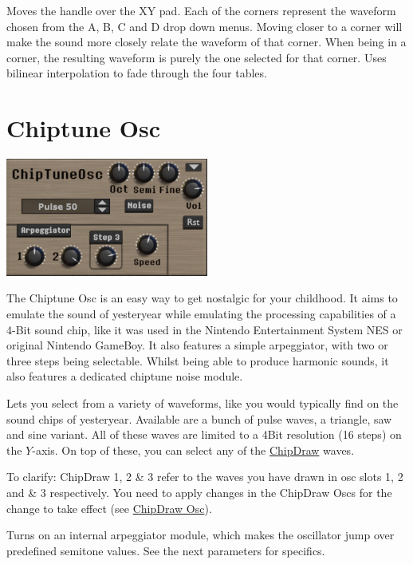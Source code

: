 {Moves the handle over the XY pad. Each of the corners represent the waveform chosen from the A, B, C and D drop down menus. Moving closer to a corner will make the sound more closely relate the waveform of that corner. When being in a corner, the resulting waveform is purely the one selected for that corner. Uses bilinear interpolation to fade through the four tables.}

\section{Chiptune Osc}
\begin{center}
    \includegraphics[width=0.5\textwidth]{graphics/chiptune_osc.png}
\end{center}
The Chiptune Osc is an easy way to get nostalgic for your childhood. It aims to emulate the sound of yesteryear while emulating the processing capabilities of a 4-Bit sound chip, like it was used in the Nintendo Entertainment System NES or original Nintendo GameBoy. It also features a simple arpeggiator, with two or three steps being selectable. Whilst being able to produce harmonic sounds, it also features a dedicated chiptune noise module.

{Lets you select from a variety of waveforms, like you would typically find on the sound chips of yesteryear. Available are a bunch of pulse waves, a triangle, saw and sine variant. All of these waves are limited to a 4Bit resolution (16 steps) on the $Y$-axis. On top of these, you can select any of the \hyperref[chipdraw]{ChipDraw} waves.

To clarify: ChipDraw 1, 2 \& 3 refer to the waves you have drawn in osc slots 1, 2 and \& 3 respectively. You need to apply changes in the ChipDraw Oscs for the change to take effect (see \hyperref[chipdraw]{ChipDraw Osc}).}

{Turns on an internal arpeggiator module, which makes the oscillator jump over predefined semitone values. See the next parameters for specifics.}

